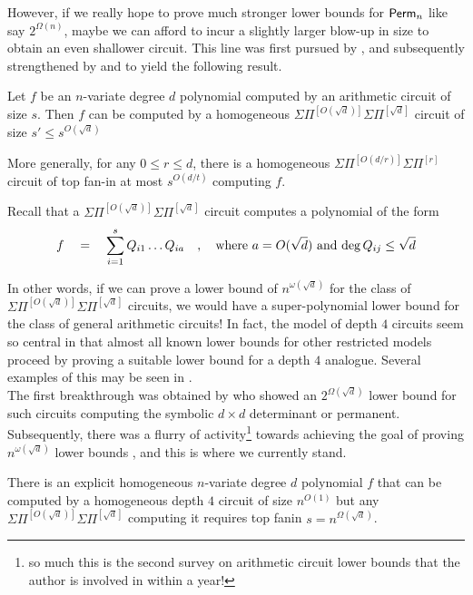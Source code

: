 \documentclass[12pt]{report}
\newcommand{\SPSPfanin}[2]{\Sigma\Pi^{[#1]}\Sigma\Pi^{[#2]}}
\begin{document}
However, if we really hope to prove much stronger lower bounds for $\mathsf{Perm}_n$ like say $2^{\Omega(n)}$, maybe we can afford to incur a slightly larger blow-up in size to obtain an even shallower circuit. This line was first pursued by \cite{av08}, and subsequently strengthened by \cite{koiran} and \cite{Tav13} to yield the following result. 

\begin{theorem} \label{thm:av}
  Let $f$ be an $n$-variate degree $d$ polynomial computed by an arithmetic circuit of size $s$. Then $f$ can be computed by a homogeneous $\SPSPfanin{O(\sqrt{d})}{\sqrt{d}}$ circuit of size $s' \leq s^{O(\sqrt{d})}$

More generally, for any $0\leq r\leq d$, there is a homogeneous $\SPSPfanin{O(d/r)}{r}$ circuit of top fan-in at most $s^{O(d/t)}$ computing $f$. 
\end{theorem}

Recall that a $\SPSPfanin{O(\sqrt{d})}{\sqrt{d}}$ circuit computes a polynomial of the form
\[
f\quad = \quad \sum_{i=1}^s Q_{i1}\dots Q_{ia} \quad,\quad \text{where $a = O(\sqrt{d})$ and $\deg Q_{ij} \leq \sqrt{d}$}
\]

In other words, if we can prove a lower bound of $n^{\omega(\sqrt{d})}$ for the class of $\SPSPfanin{O(\sqrt{d})}{\sqrt{d}}$ circuits, we would have a super-polynomial lower bound for the class of general arithmetic circuits! In fact, the model of depth $4$ circuits seem so central in that almost all known lower bounds for other restricted models proceed by proving a suitable lower bound for a depth $4$ analogue. Several examples of this may be seen in \cite{KayalRP}. \\

The first breakthrough was obtained by \cite{gkks13} who showed an $2^{\Omega(\sqrt{d})}$ lower bound for such circuits computing the symbolic $d\times d$ determinant or permanent. Subsequently, there was a flurry of activity\footnote{so much this is the second survey on arithmetic circuit lower bounds that the author is involved in within a year!} towards achieving the goal of proving $n^{\omega(\sqrt{d})}$ lower bounds \cite{KSS13,FLMS13,KS14a}, and this is where we currently stand. 

\begin{theorem}
There is an explicit homogeneous $n$-variate degree $d$ polynomial $f$ that can be computed by a homogeneous depth $4$ circuit of size $n^{O(1)}$ but any $\SPSPfanin{O(\sqrt{d})}{\sqrt{d}}$ computing it requires top fanin $s = n^{\Omega(\sqrt{d})}$.
\end{theorem}
\end{document}
